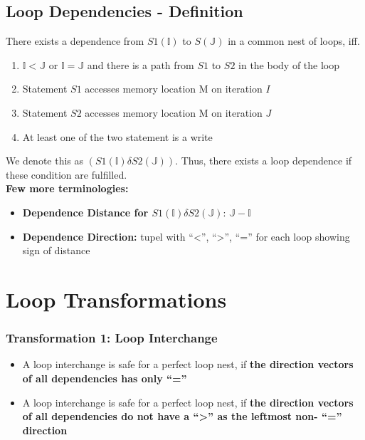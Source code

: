 \documentclass[12pt, a4paper]{report}
\begin{document}
\subsection{Loop Dependencies - Definition}
There exists a dependence from $S1(\mathbb{I})$ to $S(\mathbb{J})$ in a common nest of loops, iff.
\begin{enumerate}
    \item $\mathbb{I} < \mathbb{J}$ or $\mathbb{I} = \mathbb{J}$ and there is a path from $S1$ to $S2$ in the body of the loop
    \item Statement $S1$ accesses memory location M on iteration $I$
    \item Statement $S2$ accesses memory location M on iteration $J$
    \item At least one of the two statement is a write
\end{enumerate}
We denote this as $(S1(\mathbb{I}) \delta S2(\mathbb{J}))$. Thus, there exists a loop dependence if these condition are fulfilled.\\[0.05em]

{\bfseries{Few more terminologies:}}
\begin{itemize}
    \item {\bfseries{Dependence Distance for $S1(\mathbb{I}) \delta S2(\mathbb{J})$}}: \qquad\qquad $\mathbb{J} - \mathbb{I}$ 
    \item {\bfseries{Dependence Direction:}} tupel with ``<'', ``>'', ``='' for each loop showing sign of distance
\end{itemize}

\section{Loop Transformations}
\subsubsection{Transformation 1: Loop Interchange}
\begin{itemize}
    \item A loop interchange is safe for a perfect loop nest, if {\bfseries{the direction vectors of all dependencies has only ``=''}}
    \item A loop interchange is safe for a perfect loop nest, if {\bfseries{the direction vectors of all dependencies do not have a  ``>'' as the leftmost non-
    ``='' direction}}
\end{itemize}
\end{document}
